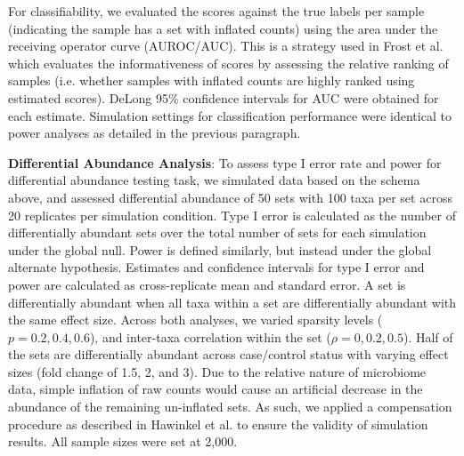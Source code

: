 \documentclass{article}
\begin{document}
For classifiability, we evaluated the scores against the true labels per sample (indicating the sample has a set with inflated counts) using the area under the receiving operator curve (AUROC/AUC). This is a strategy used in Frost et al. \cite{frost2020a} which evaluates the informativeness of scores by assessing the relative ranking of samples (i.e. whether samples with inflated counts are highly ranked using estimated scores).  DeLong 95\% confidence intervals for AUC \cite{delong1988} were obtained for each estimate. Simulation settings for classification performance were identical to power analyses as detailed in the previous paragraph. 

\noindent \textbf{Differential Abundance Analysis}: To assess type I error rate and power for differential abundance testing task, we simulated data based on the schema above, and assessed differential abundance of 50 sets with 100 taxa per set across 20 replicates per simulation condition. Type I error is calculated as the number of differentially abundant sets over the total number of sets for each simulation under the global null. Power is defined similarly, but instead under the global alternate hypothesis. Estimates and confidence intervals for type I error and power are calculated as cross-replicate mean and standard error. A set is differentially abundant when all taxa within a set are differentially abundant with the same effect size. Across both analyses, we varied sparsity levels ($p = 0.2, 0.4, 0.6$), and inter-taxa correlation within the set ($\rho = 0, 0.2, 0.5$). Half of the sets are differentially abundant across case/control status with varying effect sizes (fold change of 1.5, 2, and 3). Due to the relative nature of microbiome data, simple inflation of raw counts would cause an artificial decrease in the abundance of the remaining un-inflated sets. As such, we applied a compensation procedure as described in Hawinkel et al. \cite{hawinkel2019} to ensure the validity of simulation results. All sample sizes were set at 2,000.    
\end{document}
